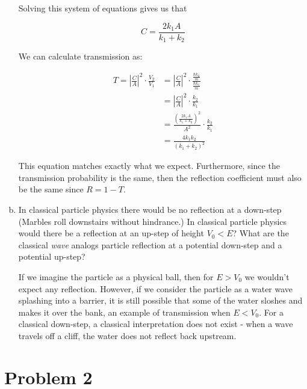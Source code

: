 \documentclass[10pt]{article}
\begin{document}
\begin{enumerate}[(a)]
\begin{solution}
            Solving this system of equations gives us that 

            \[ C = \frac{2k_1A}{k_1 + k_2}\]

            We can calculate transmission as: 

            \begin{align*}
                T = \left| \frac{C}{A}\right|^2 \cdot \frac{V_2}{V_1} &= \left|\frac CA\right|^2 \cdot \frac{\frac{\hbar k_2}{m}}{\frac{\hbar k_1}{m}}\\
                &= \left| \frac CA\right|^2 \cdot \frac{k_2}{k_1}\\
                &= \frac{\left( \frac{2k_1A}{k_1 + k_2}\right)^2}{A^2} \cdot \frac{k_2}{k_1}\\
                &= \frac{4k_1k_2}{(k_1 + k_2)^2}
            \end{align*}

            This equation matches exactly what we expect. Furthermore, since the transmission probability is the same, then the reflection coefficient must also be the same since $R = 1-T$. 
        \end{solution}
        \item In classical particle physics there would be no reflection at a down-step (Marbles roll downstairs without hindrance.) In classical particle physics would there be a reflection at an up-step of height $V_0 < E$? What are the classical \textit{wave} analogs particle reflection at a potential down-step and a potential up-step?
        
        \begin{solution}
            If we imagine the particle as a physical ball, then for $E > V_0$ we wouldn't expect any reflection. However, if we consider the particle as a water wave splashing into a barrier, it is still possible that some of the water sloshes and makes it over the bank, an example of transmission when $E < V_0$. For a classical down-step, a classical interpretation does not exist - when a wave travels off a cliff, the water does not reflect back upstream.
        \end{solution}
    \end{enumerate}

    \pagebreak

    \section*{Problem 2}
\end{document}

